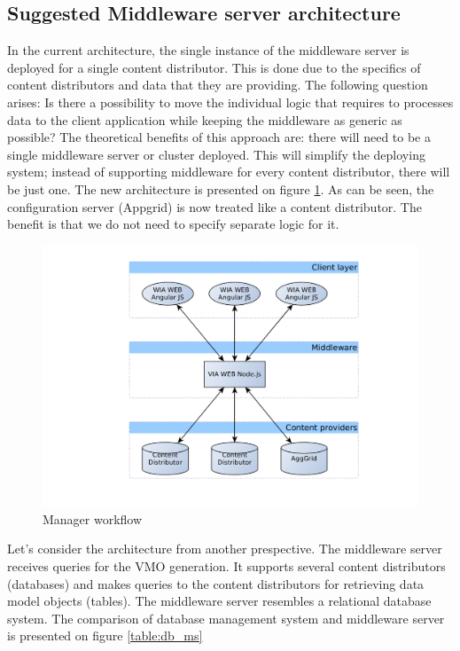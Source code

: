 \subsection{Suggested Middleware server architecture}

In the current architecture, the single instance of the middleware server is deployed for a single content distributor. This is done due to the specifics of content distributors and data that they are providing. The following question arises: Is there a possibility to move the individual logic that requires to processes data to the client application while keeping the middleware as generic as possible? The theoretical benefits of this approach are: there will need to be a single middleware server or cluster deployed. This will simplify the deploying system; instead of supporting middleware for every content distributor, there will be just one. The new architecture is presented on figure \ref{fig:arch_overview_new}. As can be seen, the configuration server (Appgrid) is now treated like a content distributor. The benefit is that we do not need to specify separate logic for it. 

\begin{figure}[h]
    \centering
	\includegraphics[width=\textwidth]{images/thesis_global_architecture_new.png}
    \caption{Manager workflow}
    \label{fig:arch_overview_new}
\end{figure}

Let's consider the architecture from another prespective.
The middleware server receives queries for the VMO generation. It supports several content distributors (databases) and makes queries to the content distributors for retrieving data model objects (tables). The middleware server resembles a relational database system. The comparison of database management system and middleware server is presented on figure \ref{table:db_ms}

